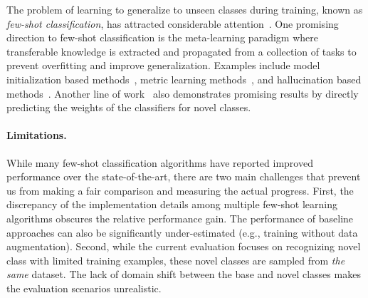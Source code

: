 \documentclass{article}
\newlength\paramargin
\begin{document}
The problem of learning to generalize to unseen classes during training, known as \emph{few-shot classification}, has attracted considerable attention~\cite{vinyals2016matching,snell2017prototypical,finn2017model,ravi2017optimization,sung2018learning,garcia2018few,qi2018low}. One promising direction to few-shot classification is the meta-learning paradigm where transferable knowledge is extracted and propagated from a collection of tasks to prevent overfitting and improve generalization. Examples include model initialization based methods~\cite{ravi2017optimization,finn2017model}, metric learning methods~\cite{vinyals2016matching,snell2017prototypical,sung2018learning}, and hallucination based methods~\cite{antoniou2018data,hariharan2017low,wang2018low}. Another line of work~\cite{gidaris2018dynamic,qi2018low} also demonstrates promising results by directly predicting the weights of the classifiers for novel classes. 

\vspace{\paramargin}
\paragraph{Limitations.} While many few-shot classification algorithms have reported improved performance over the state-of-the-art, there are two main challenges that prevent us from making a fair comparison and measuring the actual progress. First, the discrepancy of the implementation details among multiple few-shot learning algorithms obscures the relative performance gain. The performance of baseline approaches can also be significantly under-estimated (e.g., training without data augmentation). Second, while the current evaluation focuses on recognizing novel class with limited training examples, these novel classes are sampled from \emph{the same} dataset. The lack of domain shift between the base and novel classes makes the evaluation scenarios unrealistic. 



\vspace{\paramargin}
\end{document}
